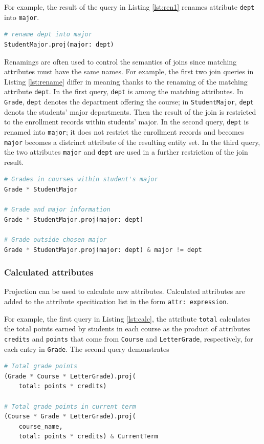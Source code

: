 \documentclass[letter,10pt]{article}
\begin{document}
For example, the result of the query in Listing \ref{lst:ren1} renames attribute \lstinline$dept$ into \lstinline$major$.
\begin{lstlisting}[language=Python, caption={Renaming attributes.}, label={lst:ren1}]
# rename dept into major
StudentMajor.proj(major: dept)
\end{lstlisting}

Renamings are often used to control the semantics of joins since matching attributes must have the same names. 
For example, the first two join queries in Listing \ref{lst:rename} differ in meaning thanks to the renaming of the matching attribute \lstinline$dept$.
In the first query, \lstinline$dept$ is among the matching attributes. In \lstinline$Grade$, \lstinline$dept$ denotes the department offering the course; in \lstinline$StudentMajor$, \lstinline$dept$ denots the students' major departments. Then the result of the join is restricted to the  enrollment records within students' major.
In the second query, \lstinline$dept$ is renamed into \lstinline$major$; it does not restrict the enrollment records and becomes \lstinline$major$ becomes a distrinct attribute of the resulting entity set. 
In the third query, the two attributes \lstinline$major$ and \lstinline$dept$ are used in a further restriction of the join result.
\begin{lstlisting}[language=Python, caption={Renaming attributes.}, label={lst:rename}]
# Grades in courses within student's major 
Grade * StudentMajor

# Grade and major information 
Grade * StudentMajor.proj(major: dept)

# Grade outside chosen major
Grade * StudentMajor.proj(major: dept) & major != dept
\end{lstlisting}

\subsubsection{Calculated attributes}
Projection can be used to calculate new attributes.  
Calculated attributes are added to the attribute specitication list in the form \lstinline$attr: expression$.
 
For example, the first query in Listing \ref{lst:calc}, the attribute \lstinline$total$ calculates the total points earned by students in each course as the product of attributes \lstinline$credits$ and \lstinline$points$ that come from \lstinline$Course$ and \lstinline$LetterGrade$, respectively, for each entry in \lstinline$Grade$.
The second query demonstrates 
\begin{lstlisting}[language=Python, caption={Extension: calculated attributes.}, label={lst:calc}]
# Total grade points
(Grade * Course * LetterGrade).proj(
    total: points * credits)

# Total grade points in current term
(Course * Grade * LetterGrade).proj(
    course_name, 
    total: points * credits) & CurrentTerm
\end{lstlisting}
\end{document}

